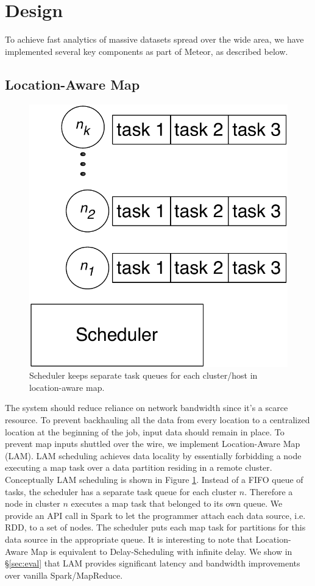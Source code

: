 \section{Design}
\label{sec: design}

To achieve fast analytics of massive datasets spread over the wide area, we have implemented several key components as part of Meteor, as described below.

\subsection{Location-Aware Map}

\begin{figure}[!ht]
\centering\includegraphics[width=0.5\columnwidth]{figs/lam.pdf}
\vspace{-1.2em}
\caption{Scheduler keeps separate task queues for each cluster/host in location-aware map.}
\label{fig:lam}
\vspace{.7em}
\end{figure}

The system should reduce reliance on network bandwidth since it's a scarce resource. To prevent backhauling
all the data from every location to a centralized location at the beginning of the job, input data should remain in place. To prevent map inputs shuttled over the wire, we implement Location-Aware Map (LAM). LAM scheduling achieves data locality by essentially forbidding a node executing a map task over a data partition residing in a remote cluster. Conceptually LAM scheduling is shown in Figure \ref{fig:lam}. Instead of a FIFO queue of tasks, the scheduler has a separate task queue for each cluster $n$. Therefore a node in cluster $n$ executes a map task that
belonged to its own queue. We provide an API call in Spark to let the programmer attach each data source, i.e. RDD, to a set of nodes. The scheduler puts each map task for partitions for this data source in the appropriate queue. It is interesting to note that Location-Aware Map is equivalent to Delay-Scheduling \cite{delay-scheduling} with infinite delay.
We show in \S \ref{sec:eval}  that LAM provides significant latency and bandwidth improvements over vanilla Spark/MapReduce. 

